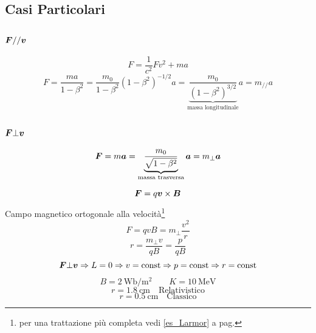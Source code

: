 \subsection{Casi Particolari}
\subsubsection{$\boldsymbol{F} // \boldsymbol{v}$}
\[F=\frac{1}{c^2}Fv^2+ma\]
\[F=\frac{ma}{1-\beta^2}=\frac{m_0}{1-\beta^2}(1-\beta^2)^{-1/2}a=\underbrace{\frac{m_0}{(1-\beta^2)^{3/2}}}_{\text{massa longitudinale}}a=m_{//}a\]
\subsubsection{$\boldsymbol{F}\bot\boldsymbol{v}$}
\[\boldsymbol{F}=m\boldsymbol{a}=\underbrace{\frac{m_0}{\sqrt{1-\beta^2}}}_\text{massa trasversa}\boldsymbol{a}=m_\perp \boldsymbol{a}\]
\begin{Es}
   \[\boldsymbol{F}=q\boldsymbol{v}\times\boldsymbol{B}\]
   Campo magnetico ortogonale alla velocità\footnote{per una trattazione più completa vedi \ref{es_Larmor} a pag.\@\pageref{es_Larmor}}
   \[F=qvB=m_\bot\frac{v^2}{r}\]
   \[r=\frac{m_\bot v}{qB}=\frac{p}{qB}\]
   \[\boldsymbol{F}\bot \boldsymbol{v}\Rightarrow L=0\Rightarrow v=\text{const}\Rightarrow p=\text{const}\Rightarrow r=\text{const}\]
   \[B=\SI{2}{\weber\per\meter\squared} \qquad K=\SI{10}{\mega\electronvolt} \]
   \[r=\SI{1.8}{\centi\meter} \quad\text{Relativistico}\]
   \[r=\SI{0.5}{\centi\meter} \quad\text{Classico}\]
\end{Es}


\pagebreak
